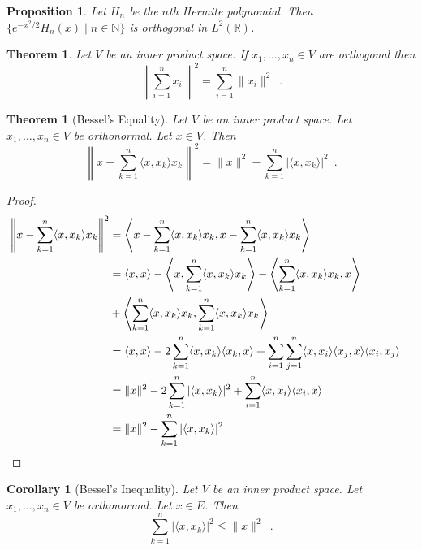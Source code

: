 \documentclass{book}
\let\qed\relax
\newtheorem{prop}[ax]{Proposition}
\newtheorem{cor}{Corollary}[ax]
\newtheorem{thm}[ax]{Theorem}
\theoremstyle{definition}
\begin{document}
\begin{prop}
Let $H_n$ be the $n$th Hermite polynomial. Then $\{ e^{-x^2/2}H_n(x) \mid n \in \mathbb{N} \}$ is orthogonal in $L^2(\mathbb{R})$.
\end{prop}

\begin{thm}
\label{thm:Pythagorean2}
Let $V$ be an inner product space.
If $x_1, \ldots, x_n \in V$ are orthogonal then
\[ \left\| \sum_{i=1}^n x_i \right\|^2 = \sum_{i=1}^n \| x_i \|^2 \enspace . \]
\end{thm}

\begin{thm}[Bessel's Equality]
Let $V$ be an inner product space. Let $x_1, \ldots, x_n \in V$ be orthonormal. Let $x \in V$. Then
\[ \left\| x - \sum_{k=1}^n \langle x, x_k \rangle x_k \right\|^2 = \|x\|^2 - \sum_{k=1}^n |\langle x, x_k \rangle|^2 \enspace . \]
\end{thm}

\begin{proof}
\pf
\begin{align*}
\left\| x - \sum_{k=1}^n \langle x, x_k \rangle x_k \right\|^2
& = \left\langle x - \sum_{k=1}^n \langle x, x_k \rangle x_k, x - \sum_{k=1}^n \langle x, x_k \rangle x_k \right\rangle \\
& = \langle x,x \rangle - \left\langle x, \sum_{k=1}^n \langle x, x_k \rangle x_k \right\rangle
- \left\langle \sum_{k=1}^n \langle x, x_k \rangle x_k, x \right\rangle \\
& + \left\langle \sum_{k=1}^n \langle x, x_k \rangle x_k, \sum_{k=1}^n \langle x, x_k \rangle x_k \right\rangle \\
& = \langle x,x \rangle - 2 \sum_{k=1}^n \langle x,x_k \rangle \langle x_k, x \rangle + \sum_{i=1}^n \sum_{j=1}^n \langle x,x_i \rangle \langle x_j,x \rangle \langle x_i,x_j \rangle \\
& = \|x\|^2 - 2 \sum_{k=1}^n |\langle x,x_k \rangle|^2 + \sum_{i=1}^n \langle x,x_i \rangle \langle x_i,x \rangle \\
& = \| x \|^2 - \sum_{k=1}^n |\langle x, x_k \rangle|^2 & \qed
\end{align*}
\end{proof}

\begin{cor}[Bessel's Inequality]
Let $V$ be an inner product space. Let $x_1, \ldots, x_n \in V$ be orthonormal. Let $x \in E$. Then
\[ \sum_{k=1}^n |\langle x, x_k \rangle|^2 \leq \|x\|^2 \enspace . \]
\end{cor}
\end{document}
